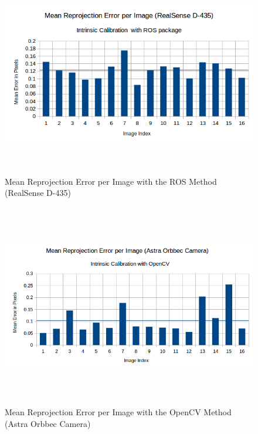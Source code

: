 \begin{figure}[!h]
\begin{center}
\includegraphics[width=5in, height=3.5in]{figures05/int/ros_int_cal_real.png}
\caption{Mean Reprojection Error per Image with the ROS Method (RealSense D-435)}%
\label{fig:realros}
\end{center}
\end{figure}

\begin{figure}[!h]
\begin{center}
\includegraphics[width=5in, height=3.5in]{figures05/int/opencv_int_cal_astra.png}
\caption{Mean Reprojection Error per Image with the OpenCV Method (Astra Orbbec Camera)}%
\label{fig:astraopen}
\end{center}
\end{figure}

